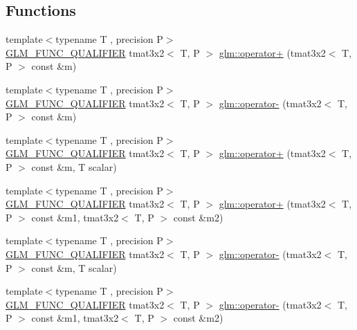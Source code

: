\subsection*{Functions}
\begin{DoxyCompactItemize}
\item 
{\footnotesize template$<$typename T , precision P$>$ }\\\mbox{\hyperlink{setup_8hpp_a33fdea6f91c5f834105f7415e2a64407}{G\+L\+M\+\_\+\+F\+U\+N\+C\+\_\+\+Q\+U\+A\+L\+I\+F\+I\+ER}} tmat3x2$<$ T, P $>$ \mbox{\hyperlink{namespaceglm_a1214e20945308ab87fab8459c686caa5}{glm\+::operator+}} (tmat3x2$<$ T, P $>$ const \&m)
\item 
{\footnotesize template$<$typename T , precision P$>$ }\\\mbox{\hyperlink{setup_8hpp_a33fdea6f91c5f834105f7415e2a64407}{G\+L\+M\+\_\+\+F\+U\+N\+C\+\_\+\+Q\+U\+A\+L\+I\+F\+I\+ER}} tmat3x2$<$ T, P $>$ \mbox{\hyperlink{namespaceglm_a004c944e52b621d162e27b2923ff5d8d}{glm\+::operator-\/}} (tmat3x2$<$ T, P $>$ const \&m)
\item 
{\footnotesize template$<$typename T , precision P$>$ }\\\mbox{\hyperlink{setup_8hpp_a33fdea6f91c5f834105f7415e2a64407}{G\+L\+M\+\_\+\+F\+U\+N\+C\+\_\+\+Q\+U\+A\+L\+I\+F\+I\+ER}} tmat3x2$<$ T, P $>$ \mbox{\hyperlink{namespaceglm_aeda033274359453516cd5137cf892765}{glm\+::operator+}} (tmat3x2$<$ T, P $>$ const \&m, T scalar)
\item 
{\footnotesize template$<$typename T , precision P$>$ }\\\mbox{\hyperlink{setup_8hpp_a33fdea6f91c5f834105f7415e2a64407}{G\+L\+M\+\_\+\+F\+U\+N\+C\+\_\+\+Q\+U\+A\+L\+I\+F\+I\+ER}} tmat3x2$<$ T, P $>$ \mbox{\hyperlink{namespaceglm_a16ca58b9b3b4625e4b708c8a91df3a71}{glm\+::operator+}} (tmat3x2$<$ T, P $>$ const \&m1, tmat3x2$<$ T, P $>$ const \&m2)
\item 
{\footnotesize template$<$typename T , precision P$>$ }\\\mbox{\hyperlink{setup_8hpp_a33fdea6f91c5f834105f7415e2a64407}{G\+L\+M\+\_\+\+F\+U\+N\+C\+\_\+\+Q\+U\+A\+L\+I\+F\+I\+ER}} tmat3x2$<$ T, P $>$ \mbox{\hyperlink{namespaceglm_a698dbc56de9b450cc0332ab8aaa72550}{glm\+::operator-\/}} (tmat3x2$<$ T, P $>$ const \&m, T scalar)
\item 
{\footnotesize template$<$typename T , precision P$>$ }\\\mbox{\hyperlink{setup_8hpp_a33fdea6f91c5f834105f7415e2a64407}{G\+L\+M\+\_\+\+F\+U\+N\+C\+\_\+\+Q\+U\+A\+L\+I\+F\+I\+ER}} tmat3x2$<$ T, P $>$ \mbox{\hyperlink{namespaceglm_a217d480e9710e6861a9b0bfeb767758c}{glm\+::operator-\/}} (tmat3x2$<$ T, P $>$ const \&m1, tmat3x2$<$ T, P $>$ const \&m2)

\end{DoxyCompactItemize}
